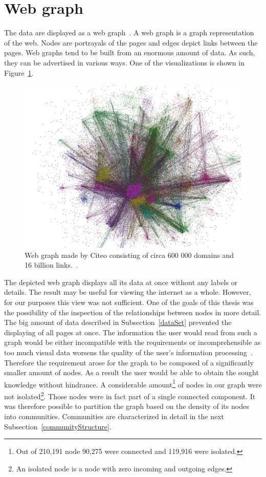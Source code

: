 \section{Web graph} \label{webGraph}
The data are displayed as a web graph~\cite{the_web_graph_overview}. A web graph is a graph representation of the web. Nodes are portrayals of the pages and edges depict links between the pages. Web graphs tend to be built from an enormous amount of data. As such, they can be advertised in various ways. One of the visualizations is shown in Figure~\ref{hugeWebGraphFireworks}. 
\begin{figure}[ht!]
  \centering
  \includegraphics[width=\textwidth]{Images/hugeWebGraphFireworks.png}
  \caption{Web graph made by Citeo consisting of circa 600 000 domains and 16 billion links.~\cite{hugeWebGraphFireworks}.}
  \label{hugeWebGraphFireworks}
\end{figure} 
The depicted web graph displays all its data at once without any labels or details. The result may be useful for viewing the internet as a whole. However, for our purposes this view was not sufficient. One of the goals of this thesis was the possibility of the inspection of the relationships between nodes in more detail. The big amount of data described in Subsection~\ref{dataSet} prevented the displaying of all pages at once. The information the user would read from such a graph would be either incompatible with the requirements or incomprehensible as too much visual data worsens the quality of the user's information processing~\cite{informationCluttering}. Therefore the requirement arose for the graph to be composed of a significantly smaller amount of nodes. As a result the user would be able to obtain the sought knowledge without hindrance. A considerable amount\footnote{Out of 210,191 node 90,275 were connected and 119,916 were isolated.} of nodes in our graph were not isolated\footnote{An isolated node is a node with zero incoming and outgoing edges.}. Those nodes were in fact part of a single connected component. It was therefore possible to partition the graph based on the density of its nodes into communities. Communities are characterized in detail in the next Subsection~\ref{communityStructure}.

